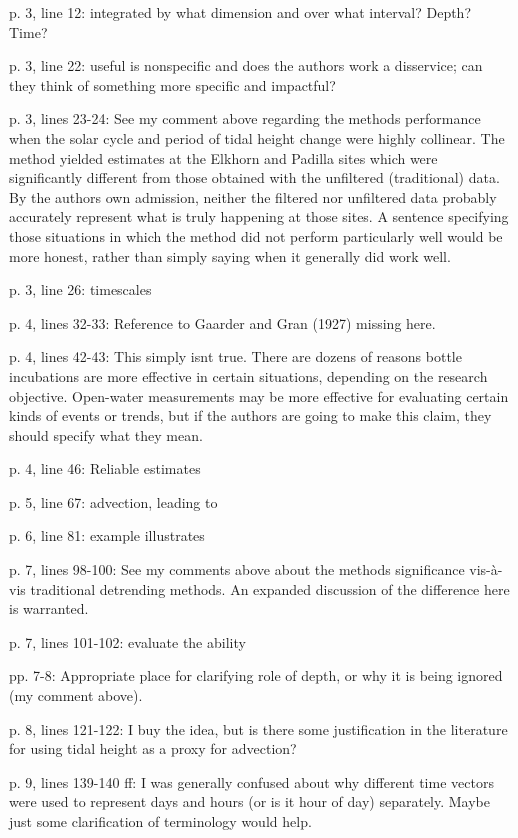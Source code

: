 \documentclass[letterpaper,12pt]{article}\usepackage[]{graphicx}\usepackage[]{color}
\begin{document}
p. 3, line 12: integrated by what dimension and over what interval? Depth? Time?

p. 3, line 22: useful is nonspecific and does the authors work a disservice; can they think of
something more specific and impactful?

p. 3, lines 23-24: See my comment above regarding the methods performance when the solar cycle and period of tidal height change were highly collinear. The method yielded estimates at the Elkhorn and Padilla sites which were significantly different from those obtained with the unfiltered (traditional) data. By the authors own admission, neither the filtered nor unfiltered data probably accurately represent what is truly happening at those sites. A sentence specifying those situations in which the method did not perform particularly well would be more honest, rather than simply saying when it generally did work well.
 

p. 3, line 26: timescales

p. 4, lines 32-33: Reference to Gaarder and Gran (1927) missing here.

p. 4, lines 42-43: This simply isnt true. There are dozens of reasons bottle incubations are more effective in certain situations, depending on the research objective. Open-water measurements may be more effective for evaluating certain kinds of events or trends, but if the authors are going to make this claim, they should specify what they mean.

p. 4, line 46: Reliable estimates

p. 5, line 67: advection, leading to

p. 6, line 81: example illustrates

p. 7, lines 98-100: See my comments above about the methods significance vis-à-vis traditional detrending methods. An expanded discussion of the difference here is warranted.

p. 7, lines 101-102: evaluate the ability

pp. 7-8: Appropriate place for clarifying role of depth, or why it is being ignored (my comment above).

p. 8, lines 121-122: I buy the idea, but is there some justification in the literature for using tidal height as a proxy for advection?

p. 9, lines 139-140 ff: I was generally confused about why different time vectors were used to represent days and hours (or is it hour of day) separately. Maybe just some clarification of terminology would help.
\end{document}
